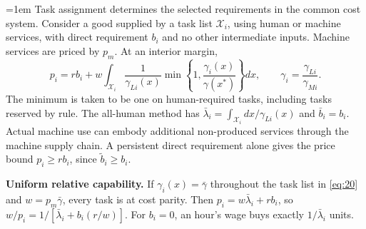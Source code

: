 \documentclass[12pt]{article}
\theoremstyle{plain}
\theoremstyle{definition}
\theoremstyle{remark}
\begin{document}
{\emergencystretch=1em
Task assignment determines the selected requirements in the common cost system. Consider a good supplied by a task list $\mathcal{X}_i$, using human or machine services, with direct requirement $b_i$ and no other intermediate inputs. Machine services are priced by $p_m$. At an interior margin,
\begin{equation}\label{eq:20}
p_i=rb_i+w\int_{\mathcal{X}_i}\frac{1}{\gamma_{Li}(x)}\min\left\{1,\frac{\gamma_i(x)}{\gamma(x^*)}\right\}dx,\qquad
\gamma_i=\frac{\gamma_{Li}}{\gamma_{Mi}}.
\end{equation}
The minimum is taken to be one on human-required tasks, including tasks reserved by rule. The all-human method has $\bar\lambda_i=\int_{\mathcal{X}_i}dx/\gamma_{Li}(x)$ and $\bar{b}_i=b_i$. Actual machine use can embody additional non-produced services through the machine supply chain. A persistent direct requirement alone gives the price bound $p_i\ge rb_i$, since $\widetilde{b}_i\ge b_i$.\par}

\textbf{Uniform relative capability.} If $\gamma_i(x)=\bar{\gamma}$ throughout the task list in \eqref{eq:20} and $w=p_m\bar{\gamma}$, every task is at cost parity. Then $p_i=w\bar\lambda_i+rb_i$, so $w/p_i=1/[\bar\lambda_i+b_i(r/w)]$. For $b_i=0$, an hour's wage buys exactly $1/\bar\lambda_i$ units.

\end{document}
